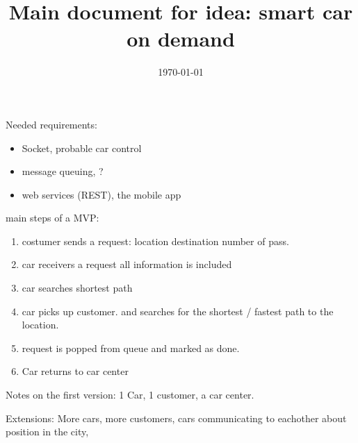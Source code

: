 \documentclass{article}
\title{Main document for idea: smart car on demand}
\author{}
\date{\today}
\begin{document}
\maketitle

Needed requirements:
\begin{itemize}
\item Socket, probable car control
\item message queuing, ?
\item web services (REST), the mobile app
\end{itemize}


main steps of a MVP:

\begin{enumerate}
\item costumer sends a request:
  location destination number of pass.
\item car receivers a request
  all information is included
\item car searches shortest path

\item car picks up customer. and searches for the shortest / fastest path to the location.

\item request is popped from queue and marked as done.

\item Car returns to car center

\end{enumerate}


Notes on the first version:
1 Car, 1 customer, a car center.

Extensions:
More cars, more customers, cars communicating to eachother about position in the city, 
\end{document}

